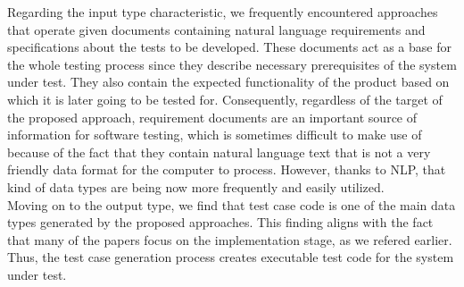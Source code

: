 Regarding the input type characteristic, we frequently encountered approaches that operate given documents containing natural language requirements and specifications about the tests to be developed. 
These documents act as a base for the whole testing process since they describe necessary prerequisites of the system under test. They also contain the expected functionality of the product based on which 
it is later going to be tested for. Consequently, regardless of the target of the proposed approach, requirement documents are an important source of information for software testing, which is sometimes 
difficult to make use of because of the fact that they contain natural language text that is not a very friendly data format for the computer to process. However, thanks to NLP, that kind of data types 
are being now more frequently and easily utilized.\\

Moving on to the output type, we find that test case code is one of the main data types generated by the proposed approaches. This finding aligns with the fact that many of the papers focus on the implementation 
stage, as we refered earlier. Thus, the test case generation process creates executable test code for the system under test.\\

